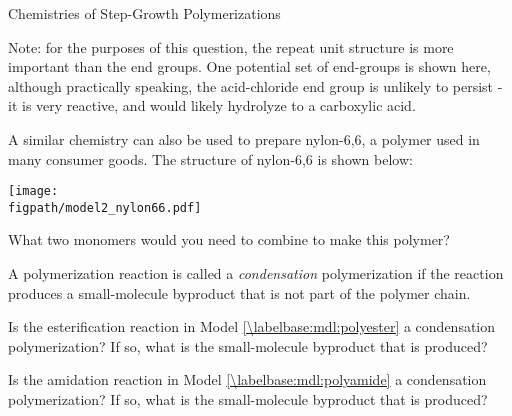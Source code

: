 \begin{activity}{Chemistries of Step-Growth Polymerizations}
\begin{ctqs}
\begin{solution}[2.5in]
{					Note: for the purposes of this question, the repeat unit structure is more important than the end groups.  One potential set of end-groups is shown here, although practically speaking, the acid-chloride end group is unlikely to persist - it is very reactive, and would likely hydrolyze to a carboxylic acid.}
				\end{solution}
		
		\clearpage
		\question A similar chemistry can also be used to prepare nylon-6,6, a polymer used in many consumer goods.
		The structure of nylon-6,6 is shown below:
		
			\centerline{\texttt{[image: \\figpath/model2\_nylon66.pdf]}}
			
		What two monomers would you need to combine to make this polymer?
			
				\begin{solution}[2in]
				\end{solution}
			
\end{ctqs}
	
\begin{infobox}

A polymerization reaction is called a \emph{condensation} polymerization if the reaction produces a small-molecule byproduct that is not part of the polymer chain.

\end{infobox}
	
\begin{ctqs}
		\question Is the esterification reaction in Model \ref{\labelbase:mdl:polyester} a condensation polymerization?  If so, what is the small-molecule byproduct that is produced?
			
				\begin{solution}[1in]\end{solution}
		
		\question Is the amidation reaction in Model \ref{\labelbase:mdl:polyamide} a condensation polymerization?  If so, what is the small-molecule byproduct that is produced?
			
				\begin{solution}[1in]\end{solution}
		

\end{ctqs}
\end{activity}
